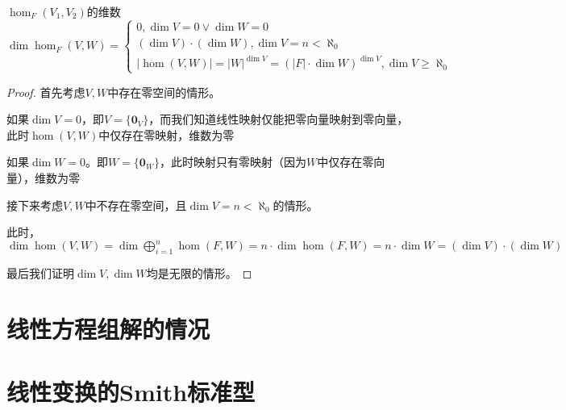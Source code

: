 \documentclass[12pt, a4paper, oneside, UTF8]{ctexbook}
\begin{document}
			\begin{them}{$\hom_F (V_1,V_2)$的维数}{}
				$\dim \hom_F (V,W)=\begin{cases}
					0, \dim V = 0 \vee \dim W=0 \\
					(\dim V)\cdot (\dim W),\dim V = n < \aleph_0 \\
					|\hom(V,W)|=|W|^{\dim V} = (|F|\cdot \dim W)^{\dim V},\dim V \geqslant \aleph_0
				\end{cases}$
			\end{them}
			\begin{proof}
				首先考虑$V,W$中存在零空间的情形。

				如果$\dim V=0$，即$V=\{\mathbf{0}_{V}\}$，而我们知道线性映射仅能把零向量映射到零向量，此时$\hom(V,W)$中仅存在零映射，维数为零

				如果$\dim W=0$。即$W=\{\mathbf{0}_W\}$，此时映射只有零映射（因为$W$中仅存在零向量），维数为零

				接下来考虑$V,W$中不存在零空间，且$\dim V = n < \aleph_0$的情形。

				此时，$\dim \hom(V,W) =\dim \bigoplus_{i=1}^{n} \hom(F,W) = n \cdot \dim \hom(F,W) = n \cdot \dim W = (\dim V)\cdot (\dim W)$

				最后我们证明$\dim V,\dim W$均是无限的情形。


			\end{proof}
		\section{线性方程组解的情况}
		\section{线性变换的Smith标准型}
	\ifx\allfiles\undefined
\end{document}
